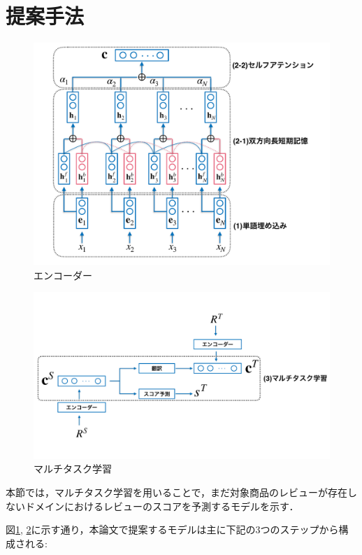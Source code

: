 \documentclass[dvipdfmx,twocolumn,10.5pt]{jsarticle}
\begin{document}
\section{提案手法}\label{suggestion}
\begin{figure}[tb]
	\centering
	\includegraphics[width=\linewidth]{images/encoder2.pdf} 
	\caption{エンコーダー}
	\label{encoder}
\end{figure}
\begin{figure}[tb]
	\centering
	\includegraphics[width=\linewidth]{images/multitaskLearning.pdf} 
	\caption{マルチタスク学習}
	\label{multitaskLearning}
\end{figure}
本節では，マルチタスク学習を用いることで，まだ対象商品のレビューが存在しないドメインにおけるレビューのスコアを予測するモデルを示す．

図\ref{encoder}, \ref{multitaskLearning}に示す通り，本論文で提案するモデルは主に下記の3つのステップから構成される:
\end{document}
